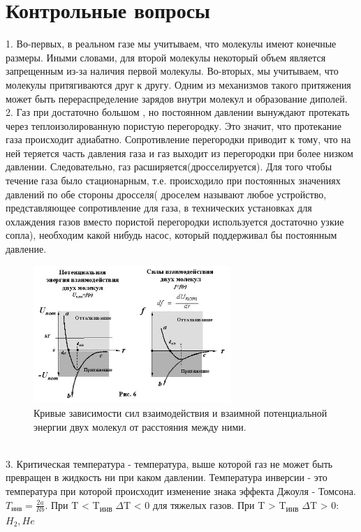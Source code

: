 \documentclass[a4paper]{article}
\begin{document}
	\section{Контрольные вопросы}
	1. Во-первых, в реальном газе мы учитываем, что молекулы имеют конечные размеры. Иными словами, для второй молекулы некоторый объем является запрещенным из-за наличия первой молекулы. Во-вторых, мы учитываем, что молекулы притягиваются друг к другу. Одним из механизмов такого притяжения может быть перераспределение зарядов внутри молекул и образование диполей.\\
	2. Газ при достаточно большом , но постоянном давлении вынуждают протекать через теплоизолированную пористую перегородку. Это значит, что протекание газа происходит адиабатно. Сопротивление перегородки приводит к тому, что на ней теряется часть давления газа и газ выходит из перегородки при более низком давлении. Следовательно, газ расширяется(дросселируется). Для того чтобы течение газа было стационарным, т.е. происходило при постоянных значениях давлений по обе стороны дросселя( дроселем называют любое устройство, представляющее сопротивление для газа, в технических установках для охлаждения газов вместо пористой перегородки используется достаточно узкие сопла), необходим какой нибудь насос, который поддерживал бы постоянным давление. \begin{figure}[ht!]
		\centering
		\includegraphics[width=75mm]{pic3.jpg}
		\caption{Кривые зависимости сил взаимодействия и взаимной потенциальной энергии двух молекул от расстояния между ними.\label{overflow}}
	\end{figure}\\
	3. Критическая температура - температура, выше которой газ не может быть превращен в жидкость ни при каком давлении. Температура инверсии - это температура при которой происходит изменение знака эффекта Джоуля - Томсона. $T_\text{инв} = \frac{2a}{Rb}$. При T < T\textsubscript{инв} $\Delta$T < 0 для тяжелых газов. При T > T\textsubscript{инв} $\Delta$T > 0: $H_2, He$ \\
\end{document}
